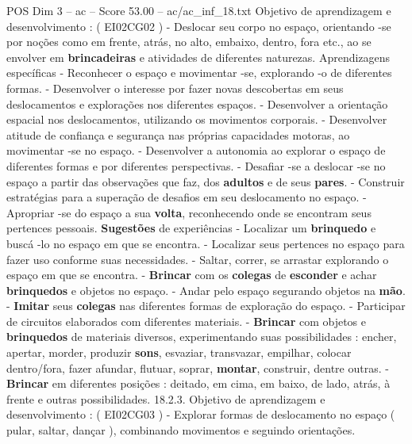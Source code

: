 \begin{textsample}{POS Dim 3 – ac – Score 53.00 – ac/ac\_inf\_18.txt}
Objetivo de aprendizagem e desenvolvimento : ( EI02CG02 ) - Deslocar seu corpo no espaço, orientando -se por noções como em frente, atrás, no alto, embaixo, dentro, fora etc., ao se envolver em \textbf{brincadeiras} e atividades de diferentes naturezas.
Aprendizagens específicas - Reconhecer o espaço e movimentar -se, explorando -o de diferentes formas. - Desenvolver o interesse por fazer novas descobertas em seus deslocamentos e explorações nos diferentes espaços. - Desenvolver a orientação espacial nos deslocamentos, utilizando os movimentos corporais. - Desenvolver atitude de confiança e segurança nas próprias capacidades motoras, ao movimentar -se no espaço. - Desenvolver a autonomia ao explorar o espaço de diferentes formas e por diferentes perspectivas. - Desafiar -se a deslocar -se no espaço a partir das observações que faz, dos \textbf{adultos} e de seus \textbf{pares}. - Construir estratégias para a superação de desafios em seu deslocamento no espaço. - Apropriar -se do espaço a sua \textbf{volta}, reconhecendo onde se encontram seus pertences pessoais. \textbf{Sugestões} de experiências - Localizar um \textbf{brinquedo} e buscá -lo no espaço em que se encontra. - Localizar seus pertences no espaço para fazer uso conforme suas necessidades. - Saltar, correr, se arrastar explorando o espaço em que se encontra. - \textbf{Brincar} com os \textbf{colegas} de \textbf{esconder} e achar \textbf{brinquedos} e objetos no espaço. - Andar pelo espaço segurando objetos na \textbf{mão}. - \textbf{Imitar} seus \textbf{colegas} nas diferentes formas de exploração do espaço. - Participar de circuitos elaborados com diferentes materiais. - \textbf{Brincar} com objetos e \textbf{brinquedos} de materiais diversos, experimentando suas possibilidades : encher, apertar, morder, produzir \textbf{sons}, esvaziar, transvazar, empilhar, colocar dentro/fora, fazer afundar, flutuar, soprar, \textbf{montar}, construir, dentre outras. - \textbf{Brincar} em diferentes posições : deitado, em cima, em baixo, de lado, atrás, à frente e outras possibilidades. 18.2.3.
Objetivo de aprendizagem e desenvolvimento : ( EI02CG03 ) - Explorar formas de deslocamento no espaço ( pular, saltar, dançar ), combinando movimentos e seguindo orientações.

\end{textsample}
